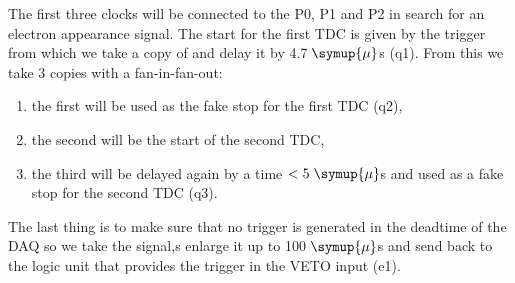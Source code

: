 The first three clocks will be connected to the P0, P1 and P2 in search for an electron
appearance signal. The start for the first TDC is given by the trigger from which we take a copy
of and delay it by 4.7$\;\symup{\mu}$s (q1). From this we take 3 copies with a fan-in-fan-out:
\begin{enumerate}
\item the first will be used as the fake stop for the first TDC (q2),
\item the second will be the start of the second TDC,
\item the third will be delayed again by a time $<5\;\symup{\mu}$s and used as a fake stop for the second TDC (q3).
\end{enumerate}
The last thing is to make sure that no trigger is generated in the deadtime of the DAQ
so we take the signal,s enlarge it up to 100$\;\symup{\mu}$s and send back to the logic
unit that provides the trigger in the VETO input (e1).\\